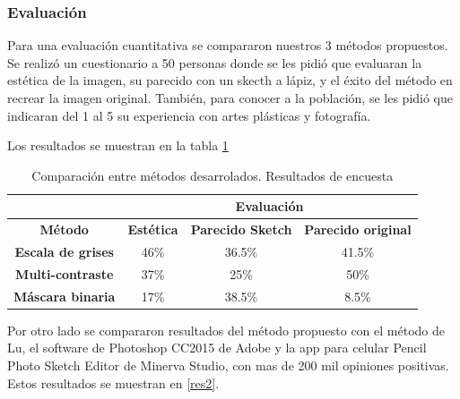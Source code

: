 \documentclass[letterpaper, 10 pt, conference]{ieeeconf}  %
\begin{document}
\subsubsection{Evaluación}
Para una evaluación cuantitativa se compararon nuestros 3 métodos propuestos. Se realizó un cuestionario a 50 personas donde se les pidió que evaluaran la estética de la imagen, su parecido con un skecth a lápiz, y el éxito del método en recrear la imagen original. También, para conocer a la población, se les pidió que indicaran del 1 al 5 su experiencia con artes plásticas y fotografía.

Los resultados se muestran en la tabla \ref{res1}
  
\begin{table}[H]

\begin{tabular}{cccc}

\hline
\textbf{}                 & \multicolumn{3}{c}{\textbf{Evaluación}}                                                                           \\ \hline
\textbf{Método}           & \textbf{Estética} & \multicolumn{1}{l}{\textbf{Parecido Sketch}} & \multicolumn{1}{l}{\textbf{Parecido original}} \\ \hline
\textbf{Escala de grises} & 46\%              & 36.5\%                                       & 41.5\%                                         \\ \hline
\textbf{Multi-contraste}  & 37\%              & 25\%                                         & 50\%                                           \\ \hline
\textbf{Máscara binaria}  & 17\%              & 38.5\%                                       & 8.5\%                                          \\ \hline
\end{tabular}

  \caption{Comparación entre métodos desarrolados. Resultados de encuesta}
  \label{res1}

\end{table}

Por otro lado se compararon resultados del método propuesto con el método de Lu\cite{lu}, el software de Photoshop CC2015 de Adobe y la app para celular Pencil Photo Sketch Editor de Minerva Studio, con mas de 200 mil opiniones positivas. Estos resultados se muestran en \ref{res2}.
\end{document}
